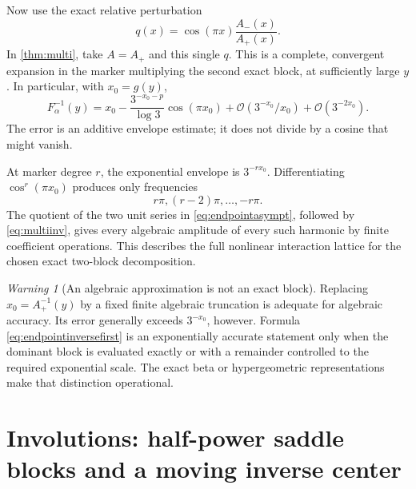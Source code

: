 \documentclass[11pt,a4paper]{article}
\theoremstyle{definition}
\theoremstyle{remark}
\newtheorem{warning}[theorem]{Warning}
\newcommand{\OO}{\mathcal O}
\numberwithin{equation}{section}
\begin{document}
Now use the exact relative perturbation
\begin{equation}
 q(x)=\cos(\pi x)\frac{A_-(x)}{A_+(x)}.
 \label{eq:endpointq}
\end{equation}
In \cref{thm:multi}, take $A=A_+$ and this single $q$. This is a complete, convergent expansion in the marker multiplying the second exact block, at sufficiently large $y$. In particular, with $x_0=g(y)$,
\begin{equation}
 F_\alpha^{-1}(y)=x_0-
 \frac{3^{-x_0-p}}{\log3}\cos(\pi x_0)
 +\OO(3^{-x_0}/x_0)+\OO(3^{-2x_0}).
 \label{eq:endpointinversefirst}
\end{equation}
The error is an additive envelope estimate; it does not divide by a cosine that might vanish.

At marker degree $r$, the exponential envelope is $3^{-rx_0}$. Differentiating $\cos^r(\pi x_0)$ produces only frequencies
\[
 r\pi,(r-2)\pi,\ldots,-r\pi.
\]
The quotient of the two unit series in \eqref{eq:endpointasympt}, followed by \eqref{eq:multiinv}, gives every algebraic amplitude of every such harmonic by finite coefficient operations. This describes the full nonlinear interaction lattice for the chosen exact two-block decomposition.

\begin{warning}[An algebraic approximation is not an exact block]
Replacing $x_0=A_+^{-1}(y)$ by a fixed finite algebraic truncation is adequate for algebraic accuracy. Its error generally exceeds $3^{-x_0}$, however. Formula \eqref{eq:endpointinversefirst} is an exponentially accurate statement only when the dominant block is evaluated exactly or with a remainder controlled to the required exponential scale. The exact beta or hypergeometric representations make that distinction operational.
\end{warning}

\section{Involutions: half-power saddle blocks and a moving inverse center}
\label{sec:involutions}
\end{document}
